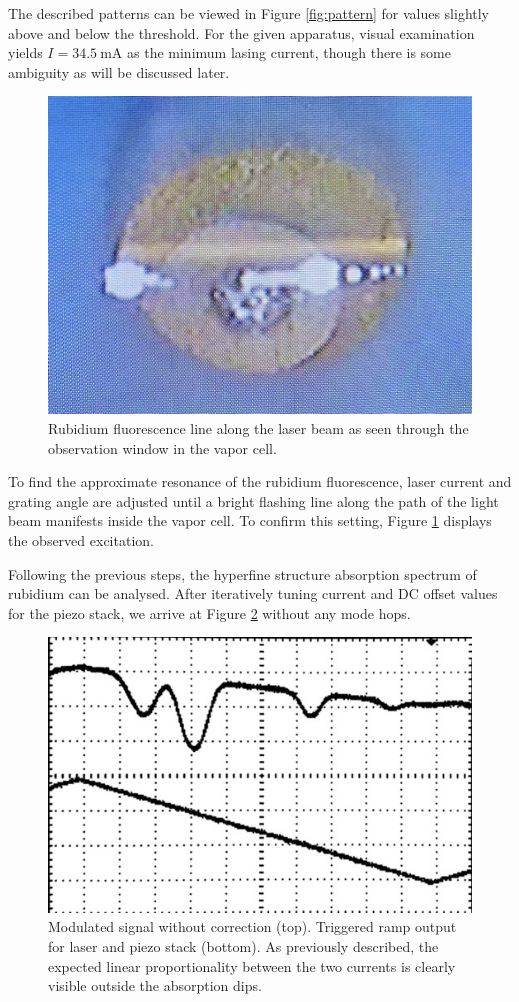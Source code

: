 The described patterns can be viewed in Figure \ref{fig:pattern} for values slightly above and below the threshold. For the given
apparatus, visual examination yields $I = \qty{34.5}{\milli\ampere}$ as the minimum lasing current, though there is some ambiguity
as will be discussed later.

\begin{figure}[H]
    \centering
    \includegraphics[width=0.48\linewidth]{content/measurement/fluorescence.jpg}
    \captionsetup{width=0.7\linewidth}
    \caption{Rubidium fluorescence line along the laser beam as seen through the observation window in the vapor cell.}
    \label{fig:fluorescence}
\end{figure}

To find the approximate resonance of the rubidium fluorescence, laser current and grating angle are adjusted until a bright flashing
line along the path of the light beam manifests inside the vapor cell. To confirm this setting, Figure \ref{fig:fluorescence} displays
the observed excitation.

Following the previous steps, the hyperfine structure absorption spectrum of rubidium can be analysed. After iteratively tuning current
and DC offset values for the piezo stack, we arrive at Figure \ref{fig:ramp} without any mode hops.

\begin{figure}[H]
    \centering
    \includegraphics[width=0.72\linewidth]{content/measurement/ramp.jpg}
    \captionsetup{width=0.8\linewidth}
    \caption{Modulated signal without correction (top). Triggered ramp output for laser and piezo stack (bottom).
             As previously described, the expected linear proportionality between the two currents is clearly visible
             outside the absorption dips.}
    \label{fig:ramp}
\end{figure}

